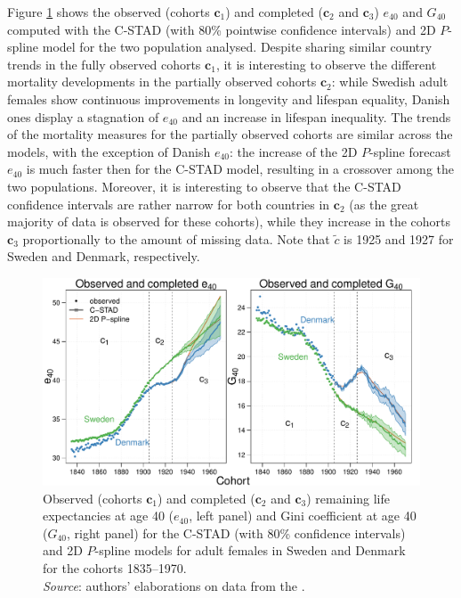 \documentclass[11pt, a4paper]{article}
\begin{document}
Figure \ref{Fig:CSTADforeE40G40} shows the observed (cohorts $\bm{c}_1$) and completed ($\bm{c}_2$ and $\bm{c}_3$) $e_{40}$ and $G_{40}$ computed with the C-STAD (with 80\% pointwise confidence intervals) and 2D $P$-spline model for the two population analysed. Despite sharing similar country trends in the fully observed cohorts $\bm{c}_1$, it is interesting to observe the different mortality developments in the partially observed cohorts $\bm{c}_2$: while Swedish adult females show continuous improvements in longevity and lifespan equality, Danish ones display a stagnation of $e_{40}$ and an increase in lifespan inequality. The trends of the mortality measures for the partially observed cohorts are similar across the models, with the exception of Danish $e_{40}$: the increase of the 2D $P$-spline forecast $e_{40}$ is much faster then for the C-STAD model, resulting in a crossover among the two populations. Moreover, it is interesting to observe that the C-STAD confidence intervals are rather narrow for both countries in $\bm{c}_2$ (as the great majority of data is observed for these cohorts), while they increase in the cohorts $\bm{c}_3$ proportionally to the amount of missing data. Note that $\tilde{c}$ is 1925 and 1927 for Sweden and Denmark, respectively.  

\begin{figure}[t]
	\begin{center}
		\includegraphics[scale=0.57]{./Figures/F6.pdf} 
		\caption{Observed (cohorts $\bm{c}_1$) and completed ($\bm{c}_2$ and $\bm{c}_3$) remaining life expectancies at age 40 ($e_{40}$, left panel) and Gini coefficient at age 40 ($G_{40}$, right panel) for the C-STAD (with 80\% confidence intervals) and 2D $P$-spline models for adult females in Sweden and Denmark for the cohorts 1835--1970.\\ \small \textit{Source}: authors' elaborations on data from the \cite{HMD}.\label{Fig:CSTADforeE40G40}}    
	\end{center}
\end{figure}
\end{document}

